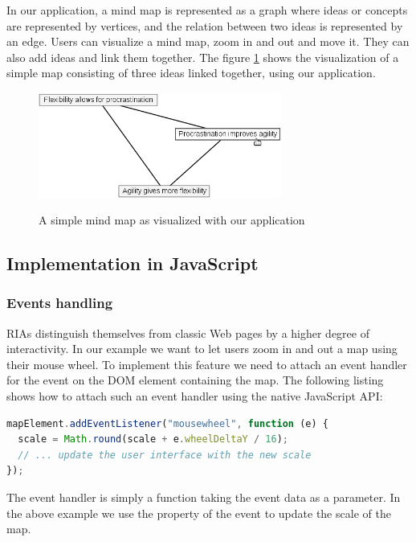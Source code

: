 \documentclass[american,english,runningheads]{llncs}
\begin{document}
In our application, a mind map is represented as a graph where ideas or concepts are represented by vertices, and the
relation between two ideas is represented by an edge. Users can visualize a mind map, zoom in and out and move it.
They can also add ideas and link them together. The figure \ref{mindmap} shows the visualization of a simple map
consisting of three ideas linked together, using our application.

\begin{figure}
 \caption{A simple mind map as visualized with our application}
 \centering
 \includegraphics[width=8cm]{mindmap.png}
 \label{mindmap}
\end{figure}

\subsection{Implementation in JavaScript}

\subsubsection{Events handling}

RIAs distinguish themselves from classic Web pages by a higher degree of interactivity. In our example we want to let users zoom
in and out a map using their mouse wheel. To implement this feature we need to attach an event handler for the
 event on the DOM element containing the map. The following listing shows how to attach such an
event handler using the native JavaScript API:

\begin{lstlisting}[language=JavaScript,label=event-js,caption=Native JavaScript API to handle events]
mapElement.addEventListener("mousewheel", function (e) {
  scale = Math.round(scale + e.wheelDeltaY / 16);
  // ... update the user interface with the new scale
});
\end{lstlisting}

The event handler is simply a function taking the event data as a parameter. In the above example we use the
 property of the event to update the scale of the map.
\end{document}

